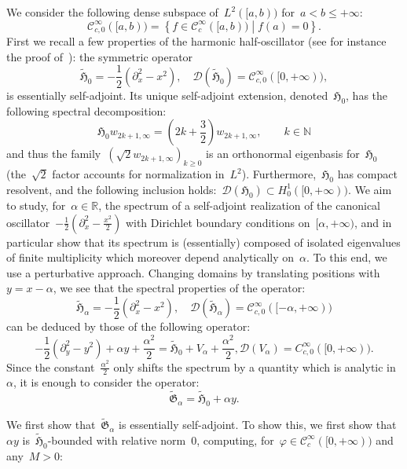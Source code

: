 \documentclass[10pt]{article}
\newcommand{\R}{\mathbb{R}}
\newcommand{\N}{\mathbb N}
\newcommand{\1}{\mathbbm 1}
\begin{document}
    We consider the following dense subspace of~$L^2([a,b))$ for~$a<b\leq +\infty$:
    \[\mathcal C^\infty_{c,0}([a,b)) = \left\{f\in \mathcal C^\infty_c([a,b))\middle| f(a)=0\right\}.\]
    First we recall a few properties of the harmonic half-oscillator (see for instance the proof of~\cite[Proposition S1.2.10]{BS12}): the symmetric operator
   ~$$ \widetilde{\mathfrak H}_0 = -\frac12(\partial_x^2-x^2),\quad \mathcal D(\widetilde{\mathfrak H}_0) = \mathcal C^\infty_{c,0}([0,+\infty)),$$
    is essentially self-adjoint. Its unique self-adjoint extension, denoted~$\mathfrak{H}_0$, has the following spectral decomposition:
    \begin{equation}
        \label{harmonic_half_oscillator}
        \mathfrak{H}_0 w_{2k+1,\infty} = \left(2k + \frac32\right) w_{2k+1,\infty},\qquad k\in \N
    \end{equation}
    and thus the family~$(\sqrt 2 w_{2k+1,\infty})_{k\geq 0}$ is an orthonormal eigenbasis for~$\mathfrak{H}_0$ (the~$\sqrt 2$ factor accounts for normalization in~$L^2$). Furthermore,~$\mathfrak{H}_0$ has compact resolvent, and the following inclusion holds:~$\mathcal D({\mathfrak{H}}_0) \subset H_0^1([0,+\infty))$.
    We aim to study, for~$\alpha\in\R$, the spectrum of a self-adjoint realization of the canonical oscillator~$-\frac12(\partial_x^2-\frac{x^2}2)$ with Dirichlet boundary conditions on~$[\alpha,+\infty)$, and in particular show that its spectrum is (essentially) composed of isolated eigenvalues of finite multiplicity which moreover depend analytically on~$\alpha$.
    To this end, we use a perturbative approach. Changing domains by translating positions with~$y = x-\alpha$, we see that the spectral properties of the operator:
   ~$$\widetilde{\mathfrak H}_\alpha = -\frac12(\partial_x^2-x^2),\quad \mathcal D(\widetilde{\mathfrak H}_\alpha) = \mathcal C^\infty_{c,0}([-\alpha,+\infty))$$
    can be deduced by those of the following operator:
   ~$$-\frac12(\partial_y^2-y^2) + \alpha y +\frac{\alpha^2}2 = \widetilde{\mathfrak H}_0 + V_\alpha + \frac{\alpha^2}2, \mathcal D(V_\alpha) = C^\infty_{c,0}([0,+\infty)).$$
    Since the constant~$\frac{\alpha^2}2$ only shifts the spectrum by a quantity which is analytic in~$\alpha$, it is enough to consider the operator:
   ~$$\widetilde{\mathfrak{G}}_\alpha = \widetilde{\mathfrak{H}}_0 + \alpha y.$$

    We first show that~$\widetilde{\mathfrak{G}}_\alpha$ is essentially self-adjoint.
    To show this, we first show that~$\alpha y$ is~$\widetilde{\mathfrak H}_0$-bounded with relative norm~$0$, computing, for~$\varphi \in \mathcal C^\infty_c([0,+\infty))$ and any~$M>0$:
\end{document}
